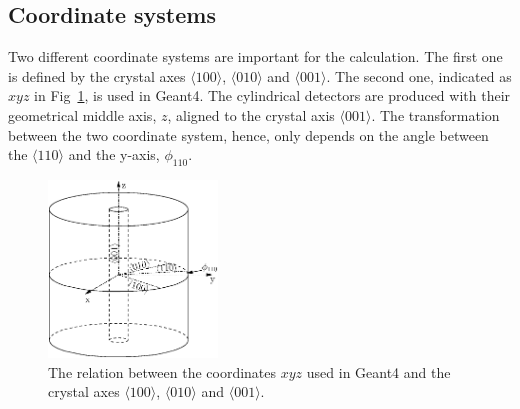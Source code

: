 \subsection{Coordinate systems}
\label{sec:pss:xyz}
Two different coordinate systems are important for the calculation. The first one is defined by the crystal axes $\langle 100 \rangle$, $\langle 010 \rangle$ and $\langle 001 \rangle$. The second one, indicated as $xyz$ in Fig~\ref{fig:pss:coo}, is used in Geant4. The cylindrical detectors are produced with their geometrical middle axis, $z$, aligned to the crystal axis $\langle 001 \rangle$. The transformation between the two coordinate system, hence, only depends on the angle between the $\langle 110 \rangle$ and the y-axis, $\phi_{110}$.
\begin{figure}
\centering
\includegraphics[width=0.4\textwidth]{coordins}  
\caption{The relation between the coordinates $xyz$ used in Geant4 and the crystal axes $\langle 100 \rangle$, $\langle 010 \rangle$ and $\langle 001 \rangle$.}
\label{fig:pss:coo}
\end{figure}

